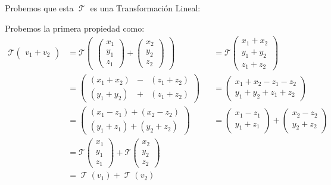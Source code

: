 \documentclass[12pt, fleqn]{report}                             %
\theoremstyle{break}                                            %
\DeclareMathOperator \LinTrans {\mathcal{T}}                    %
\newcommand{\VecLinTrans}[1]{\mathcal{T}\pVector{#1}}           %
\newcommand{\pVector}[1]                                        %
        { \ensuremath{\begin{pmatrix}#1\end{pmatrix}} }             %
\begin{document}
                    Probemos que esta $\LinTrans$ es una Transformación Lineal:

                    Probemos la primera propiedad como:
                    \begin{align*}
                        \VecLinTrans{ v_1 + v_2 }                                             
                            &= \VecLinTrans{ \pVector{x_1\\y_1\\z_1} +\pVector{x_2\\y_2\\z_2} }
                                &&= \VecLinTrans{ x_1+x_2\\y_1+y_2\\z_1+z_2 }                               \\
                            &= \pVector{ (x_1+x_2) & - & (z_1+z_2) \\ (y_1+y_2) & + & (z_1+z_2) }                       
                                &&= \pVector{ x_1+x_2-z_1-z_2 \\ y_1+y_2+z_1+z_2 }                          \\
                            &= \pVector{ (x_1-z_1)+(x_2-z_2) \\ (y_1+z_1)+(y_2+z_2) }                                   
                                &&= \pVector{ x_1-z_1\\y_1+z_1 }  + \pVector{ x_2-z_2\\y_2+z_2 }            \\
                            &= \VecLinTrans{x_1\\y_1\\z_1} +\VecLinTrans{x_2\\y_2\\z_2}                     \\
                            &= \LinTrans(v_1) + \LinTrans(v_2)
                    \end{align*}
\end{document}
